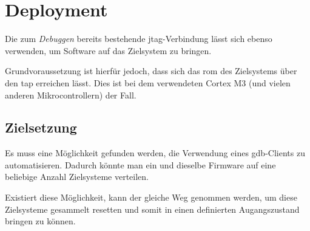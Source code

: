 \section{Deployment}
Die zum \emph{Debuggen} bereits bestehende \gls{jtag}-Verbindung lässt sich
ebenso verwenden, um Software auf das Zielsystem zu bringen.

Grundvoraussetzung ist hierfür jedoch, dass sich das \gls{rom} des Zielsystems
über den \gls{tap} erreichen lässt. Dies ist bei dem verwendeten Cortex M3
(und vielen anderen Mikrocontrollern) der Fall.
\subsection{Zielsetzung}
Es muss eine Möglichkeit gefunden werden, die Verwendung eines \gls{gdb}-Clients
zu automatisieren. Dadurch könnte man ein und dieselbe Firmware auf eine
beliebige Anzahl Zielsysteme verteilen.

Existiert diese Möglichkeit, kann der gleiche Weg genommen werden, um diese
Zielsysteme gesammelt resetten und somit in einen definierten Augangszustand
bringen zu können.
